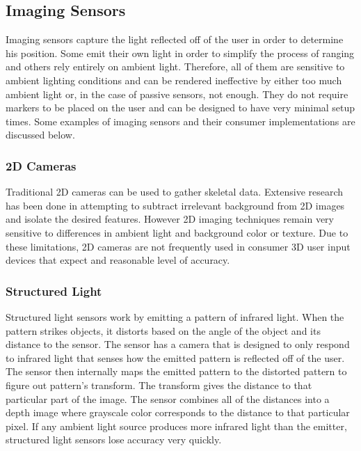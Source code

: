 \subsection{Imaging Sensors}

Imaging sensors capture the light reflected off of the user in order to determine his position. Some emit their own light in order to simplify the process of ranging and others rely entirely on ambient light. Therefore, all of them are sensitive to ambient lighting conditions and can be rendered ineffective by either too much ambient light or, in the case of passive sensors, not enough. They do not require markers to be placed on the user and can be designed to have very minimal setup times. Some examples of imaging sensors and their consumer implementations are discussed below.

\subsubsection{2D Cameras}

Traditional 2D cameras can be used to gather skeletal data. Extensive research has been done in attempting to subtract irrelevant background from 2D images and isolate the desired features. However 2D imaging techniques remain very sensitive to differences in ambient light and background color or texture. Due to these limitations, 2D cameras are not frequently used in consumer 3D user input devices that expect and reasonable level of accuracy.

\subsubsection{Structured Light}

Structured light sensors work by emitting a pattern of infrared light. When the pattern strikes objects, it distorts based on the angle of the object and its distance to the sensor. The sensor has a camera that is designed to only respond to infrared light that senses how the emitted pattern is reflected off of the user. The sensor then internally maps the emitted pattern to the distorted pattern to figure out pattern’s transform. The transform gives the distance to that particular part of the image. The sensor combines all of the distances into a depth image where grayscale color corresponds to the distance to that particular pixel. If any ambient light source produces more infrared light than the emitter, structured light sensors lose accuracy very quickly.

